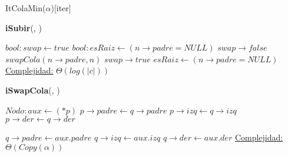 \begin{Estructura}{ItColaMin($\alpha$)}[iter]
\begin{algorithm}[H]{\textbf{iSubir}(, )}
    	\begin{algorithmic}[1]
		\State $bool: swap \gets true$ 		
		\State $bool: esRaiz \gets (n \rightarrow padre = NULL)  $ 		
			\State $swap \rightarrow false$ 			
			 
				\State $swapCola(n \rightarrow padre, n) $ 
				\State $swap \rightarrow true$ 
			\EndIf			
			\State $esRaiz \gets (n \rightarrow padre = NULL)  $ 		
		\EndWhile
		\medskip
		\Statex \underline{Complejidad:} $\Theta(log(|c|))$
    	\end{algorithmic}
\end{algorithm}

\begin{algorithm}[H]{\textbf{iSwapCola}{(, })}
   	\begin{algorithmic}[1]
			\State $Nodo: aux \gets (*p) $ 
			\State $p \rightarrow padre \gets q \rightarrow padre $ 
			\State $p \rightarrow izq \gets q \rightarrow izq $ 
			\State $p \rightarrow der \gets q \rightarrow der $ 
			
			\State $q \rightarrow padre \gets aux.padre $ 
			\State $q \rightarrow izq \gets aux.izq $ 
			\State $q \rightarrow der \gets aux.der $ 
			\Statex \underline{Complejidad:} $\Theta(Copy(\alpha))$
   	\end{algorithmic}
\end{algorithm}    	
    	

\end{Estructura}
